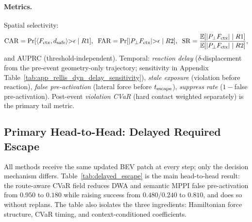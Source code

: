 \paragraph{Metrics.}
Spatial selectivity:
\begin{equation}
\mathrm{CAR}=\Pr[\langle F_{\rm ctx},d_{\rm safe}\rangle{>}\epsilon\mid R1],\;\;
\mathrm{FAR}=\Pr[|P_\perp F_{\rm ctx}|{>}\epsilon\mid R2],\;\;
\mathrm{SR}=\frac{\mathbb{E}[|P_\perp F_{\rm ctx}|\mid R1]}
                 {\mathbb{E}[|P_\perp F_{\rm ctx}|\mid R2]},
\end{equation}
and AUPRC (threshold-independent). Temporal: \emph{reaction delay}
($\delta$-displacement from the pre-event geometry-only trajectory; sensitivity in
Appendix Table~\ref{tab:app_rellis_dyn_delay_sensitivity}),
\emph{stale exposure} (violation before reaction),
\emph{false pre-activation} (lateral force before $t_{\rm escape}$),
\emph{suppress rate} ($1-$false pre-activation).
Post-event \emph{violation CVaR} (hard contact weighted separately) is
the primary tail metric.

\subsection{Primary Head-to-Head: Delayed Required Escape}
\label{sec:exp_primary_delayed}

All methods receive the same updated BEV patch at every step; only the
decision mechanism differs. Table~\ref{tab:delayed_escape} is the main
head-to-head result: the route-aware CVaR field reduces DWA and semantic
MPPI false pre-activation from $0.950$ to $0.180$ while raising success
from $0.480$/$0.240$ to $0.810$, and does so without replans. The table also isolates the
three ingredients: Hamiltonian force structure, CVaR timing, and
context-conditioned coefficients.

